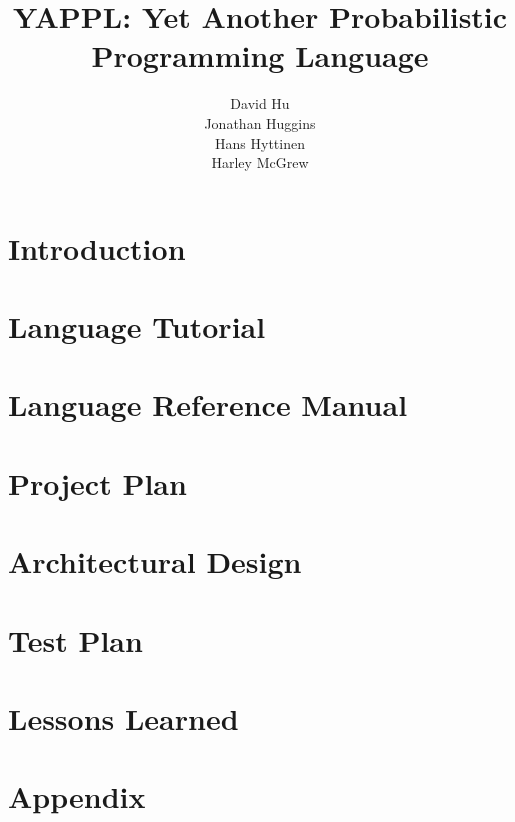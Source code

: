 \documentclass[11pt]{article}
\begin{document}
\setcounter{secnumdepth}{5}


\title{YAPPL: Yet Another Probabilistic Programming Language}
\author{  David Hu \\ Jonathan Huggins \\ Hans Hyttinen  \\ Harley McGrew}

\maketitle

\fancyhead{}
\fancyhead[L]{}
\fancyhead[R]{}

\newpage

\tableofcontents

\newpage

\section{Introduction}

\newpage

\section{Language Tutorial}

\newpage

\section{Language Reference Manual}

\newpage

\section{Project Plan}

\newpage

\section{Architectural Design}

\newpage

\section{Test Plan}

\newpage

\section{Lessons Learned}

\newpage

\section{Appendix}

\newpage
\end{document}
